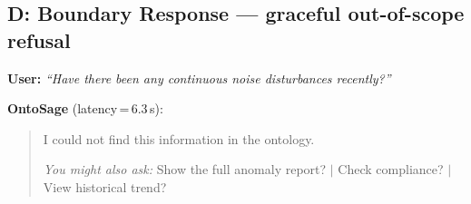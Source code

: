 \documentclass[acmsmall]{acmart}
\begin{document}
\subsection*{D: Boundary Response --- graceful out-of-scope refusal}

\noindent\textbf{User:} \emph{``Have there been any continuous noise disturbances recently?''}

\noindent\textbf{OntoSage} (latency\,=\,6.3\,s):
\begin{quote}\small
I could not find this information in the ontology.

\textit{You might also ask:} Show the full anomaly report? $\mid$ Check compliance? $\mid$ View historical trend?
\end{quote}



\end{document}
